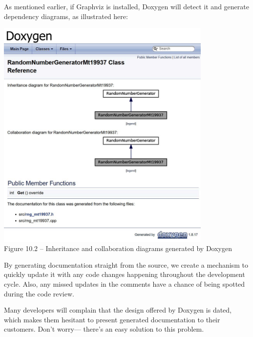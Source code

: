 As mentioned earlier, if Graphviz is installed, Doxygen will detect it and generate dependency diagrams, as illustrated here:

\begin{center}
\includegraphics[width=0.8\textwidth]{content/3/chapter10/images/2.jpg}\\
Figure 10.2 – Inheritance and collaboration diagrams generated by Doxygen
\end{center}

By generating documentation straight from the source, we create a mechanism to quickly update it with any code changes happening throughout the development cycle. Also, any missed updates in the comments have a chance of being spotted during the code review.

Many developers will complain that the design offered by Doxygen is dated, which makes them hesitant to present generated documentation to their customers. Don't worry— there's an easy solution to this problem.









